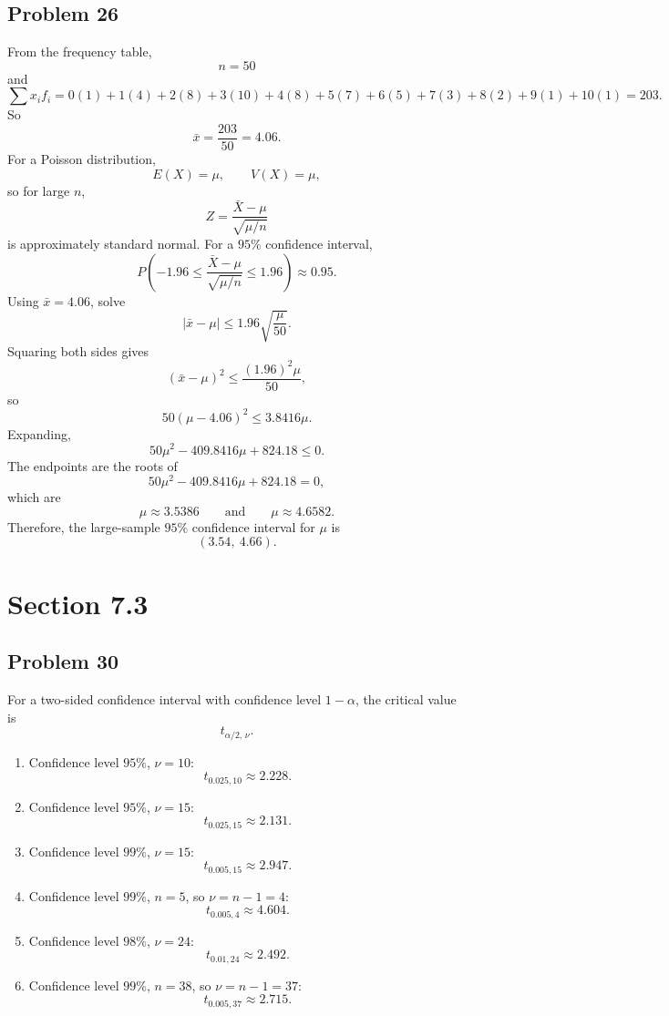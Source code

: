 \documentclass[11pt]{article}
\begin{document}
\subsection*{Problem 26}

From the frequency table,
\[
n=50
\]
and
\[
\sum x_if_i=0(1)+1(4)+2(8)+3(10)+4(8)+5(7)+6(5)+7(3)+8(2)+9(1)+10(1)=203.
\]
So
\[
\bar{x}=\frac{203}{50}=4.06.
\]
For a Poisson distribution,
\[
E(X)=\mu, \qquad V(X)=\mu,
\]
so for large $n$,
\[
Z=\frac{\bar{X}-\mu}{\sqrt{\mu/n}}
\]
is approximately standard normal. For a $95\%$ confidence interval,
\[
P\left(-1.96\le \frac{\bar{X}-\mu}{\sqrt{\mu/n}}\le 1.96\right)\approx 0.95.
\]
Using $\bar{x}=4.06$, solve
\[
|\bar{x}-\mu|\le 1.96\sqrt{\frac{\mu}{50}}.
\]
Squaring both sides gives
\[
(\bar{x}-\mu)^2\le \frac{(1.96)^2\mu}{50},
\]
so
\[
50(\mu-4.06)^2\le 3.8416\mu.
\]
Expanding,
\[
50\mu^2-409.8416\mu+824.18\le 0.
\]
The endpoints are the roots of
\[
50\mu^2-409.8416\mu+824.18=0,
\]
which are
\[
\mu\approx 3.5386 \qquad \text{and} \qquad \mu\approx 4.6582.
\]
Therefore, the large-sample $95\%$ confidence interval for $\mu$ is
\[
(3.54,\ 4.66).
\]

\section*{Section 7.3}

\subsection*{Problem 30}

For a two-sided confidence interval with confidence level $1-\alpha$, the critical value is
\[
t_{\alpha/2,\,\nu}.
\]

\begin{enumerate}
\item[(a)] Confidence level $95\%$, $\nu=10$:
\[
t_{0.025,10}\approx 2.228.
\]

\item[(b)] Confidence level $95\%$, $\nu=15$:
\[
t_{0.025,15}\approx 2.131.
\]

\item[(c)] Confidence level $99\%$, $\nu=15$:
\[
t_{0.005,15}\approx 2.947.
\]

\item[(d)] Confidence level $99\%$, $n=5$, so $\nu=n-1=4$:
\[
t_{0.005,4}\approx 4.604.
\]

\item[(e)] Confidence level $98\%$, $\nu=24$:
\[
t_{0.01,24}\approx 2.492.
\]

\item[(f)] Confidence level $99\%$, $n=38$, so $\nu=n-1=37$:
\[
t_{0.005,37}\approx 2.715.
\]
\end{enumerate}
\end{document}
